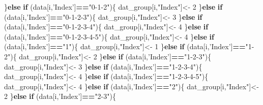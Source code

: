 \documentclass[]{article}
\newenvironment{Shaded}{\begin{snugshade}}{\end{snugshade}}
\newcommand{\DecValTok}[1]{\textcolor[rgb]{0.00,0.00,0.81}{#1}}
\newcommand{\StringTok}[1]{\textcolor[rgb]{0.31,0.60,0.02}{#1}}
\newcommand{\ControlFlowTok}[1]{\textcolor[rgb]{0.13,0.29,0.53}{\textbf{#1}}}
\newcommand{\OperatorTok}[1]{\textcolor[rgb]{0.81,0.36,0.00}{\textbf{#1}}}
\newcommand{\NormalTok}[1]{#1}
\begin{document}
\begin{Shaded}
\begin{Highlighting}[]
\NormalTok{  \}}\ControlFlowTok{else} \ControlFlowTok{if}\NormalTok{ (data[i,}\StringTok{'Index'}\NormalTok{]}\OperatorTok{==}\StringTok{"0-1-2"}\NormalTok{)\{}
\NormalTok{    dat_group[i,}\StringTok{"Index"}\NormalTok{]<-}\StringTok{ }\DecValTok{2}
\NormalTok{  \}}\ControlFlowTok{else} \ControlFlowTok{if}\NormalTok{ (data[i,}\StringTok{'Index'}\NormalTok{]}\OperatorTok{==}\StringTok{"0-1-2-3"}\NormalTok{)\{}
\NormalTok{    dat_group[i,}\StringTok{"Index"}\NormalTok{]<-}\StringTok{ }\DecValTok{3}
\NormalTok{  \}}\ControlFlowTok{else} \ControlFlowTok{if}\NormalTok{ (data[i,}\StringTok{'Index'}\NormalTok{]}\OperatorTok{==}\StringTok{"0-1-2-3-4"}\NormalTok{)\{}
\NormalTok{    dat_group[i,}\StringTok{"Index"}\NormalTok{]<-}\StringTok{ }\DecValTok{4}
\NormalTok{  \}}\ControlFlowTok{else} \ControlFlowTok{if}\NormalTok{ (data[i,}\StringTok{'Index'}\NormalTok{]}\OperatorTok{==}\StringTok{"0-1-2-3-4-5"}\NormalTok{)\{}
\NormalTok{    dat_group[i,}\StringTok{"Index"}\NormalTok{]<-}\StringTok{ }\DecValTok{4}
\NormalTok{  \}}\ControlFlowTok{else} \ControlFlowTok{if}\NormalTok{ (data[i,}\StringTok{'Index'}\NormalTok{]}\OperatorTok{==}\StringTok{"1"}\NormalTok{)\{}
\NormalTok{    dat_group[i,}\StringTok{"Index"}\NormalTok{]<-}\StringTok{ }\DecValTok{1}
\NormalTok{  \}}\ControlFlowTok{else} \ControlFlowTok{if}\NormalTok{ (data[i,}\StringTok{'Index'}\NormalTok{]}\OperatorTok{==}\StringTok{"1-2"}\NormalTok{)\{}
\NormalTok{    dat_group[i,}\StringTok{"Index"}\NormalTok{]<-}\StringTok{ }\DecValTok{2}
\NormalTok{  \}}\ControlFlowTok{else} \ControlFlowTok{if}\NormalTok{ (data[i,}\StringTok{'Index'}\NormalTok{]}\OperatorTok{==}\StringTok{"1-2-3"}\NormalTok{)\{}
\NormalTok{    dat_group[i,}\StringTok{"Index"}\NormalTok{]<-}\StringTok{ }\DecValTok{3}
\NormalTok{  \}}\ControlFlowTok{else} \ControlFlowTok{if}\NormalTok{ (data[i,}\StringTok{'Index'}\NormalTok{]}\OperatorTok{==}\StringTok{"1-2-3-4"}\NormalTok{)\{}
\NormalTok{    dat_group[i,}\StringTok{"Index"}\NormalTok{]<-}\StringTok{ }\DecValTok{4}
\NormalTok{  \}}\ControlFlowTok{else} \ControlFlowTok{if}\NormalTok{ (data[i,}\StringTok{'Index'}\NormalTok{]}\OperatorTok{==}\StringTok{"1-2-3-4-5"}\NormalTok{)\{}
\NormalTok{    dat_group[i,}\StringTok{"Index"}\NormalTok{]<-}\StringTok{ }\DecValTok{4}
\NormalTok{  \}}\ControlFlowTok{else} \ControlFlowTok{if}\NormalTok{ (data[i,}\StringTok{'Index'}\NormalTok{]}\OperatorTok{==}\StringTok{"2"}\NormalTok{)\{}
\NormalTok{    dat_group[i,}\StringTok{"Index"}\NormalTok{]<-}\StringTok{ }\DecValTok{2}
\NormalTok{  \}}\ControlFlowTok{else} \ControlFlowTok{if}\NormalTok{ (data[i,}\StringTok{'Index'}\NormalTok{]}\OperatorTok{==}\StringTok{"2-3"}\NormalTok{)\{}

\end{Highlighting}
\end{Shaded}
\end{document}
